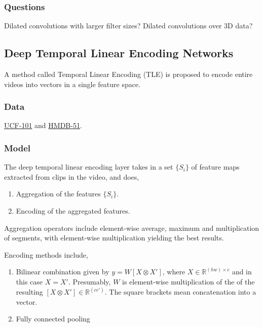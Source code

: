 \documentclass[a4paper, 12pt]{article}
\begin{document}
\subsubsection{Questions}

Dilated convolutions with larger filter sizes? Dilated convolutions over 3D
data?


\subsection{Deep Temporal Linear Encoding
            Networks\citet{DBLP:journals/corr/DibaSG16}}

A method called Temporal Linear Encoding (TLE) is proposed to encode entire
videos into vectors in a single feature space.

\subsubsection{Data}

\hyperref[ucf101]{UCF-101} and \hyperref[hmdb51]{HMDB-51}.

\subsubsection{Model}

The deep temporal linear encoding layer takes in a set $\{S_i\}$ of feature
maps extracted from clips in the video, and does,

\begin{enumerate}
        \item Aggregation of the features $\{S_i\}$.
        \item Encoding of the aggregated features.
\end{enumerate}

Aggregation operators include element-wise average, maximum and multiplication
of segments, with element-wise multiplication yielding the best results.

Encoding methods include,

\begin{enumerate}
        \item Bilinear combination given by $y = W[X \otimes X']$, where $X \in
                \mathbb{R}^{(hw) \times c}$ and in this case $X = X'$.
                Presumably, $W$ is element-wise multiplication of the of the
                resulting $[X \otimes X'] \in \mathbb{R}^{(cc')}$. The square
                brackets mean concatenation into a vector.

        \item Fully connected pooling
\end{enumerate}
\end{document}
